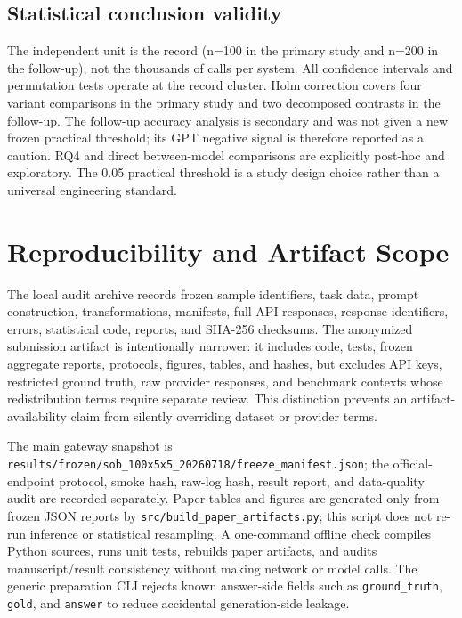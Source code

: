 \documentclass[10pt]{article}
\begin{document}
\subsection{Statistical conclusion validity}
The independent unit is the record (n=100 in the primary study and n=200 in the follow-up), not the thousands of calls per system. All confidence intervals and permutation tests operate at the record cluster. Holm correction covers four variant comparisons in the primary study and two decomposed contrasts in the follow-up. The follow-up accuracy analysis is secondary and was not given a new frozen practical threshold; its GPT negative signal is therefore reported as a caution. RQ4 and direct between-model comparisons are explicitly post-hoc and exploratory. The 0.05 practical threshold is a study design choice rather than a universal engineering standard.

\section{Reproducibility and Artifact Scope}
The local audit archive records frozen sample identifiers, task data, prompt construction, transformations, manifests, full API responses, response identifiers, errors, statistical code, reports, and SHA-256 checksums. The anonymized submission artifact is intentionally narrower: it includes code, tests, frozen aggregate reports, protocols, figures, tables, and hashes, but excludes API keys, restricted ground truth, raw provider responses, and benchmark contexts whose redistribution terms require separate review. This distinction prevents an artifact-availability claim from silently overriding dataset or provider terms.

The main gateway snapshot is \texttt{results/\allowbreak{}frozen/s\allowbreak{}ob\_100x5\allowbreak{}x5\_20260\allowbreak{}718/free\allowbreak{}ze\_manif\allowbreak{}est.json}; the official-endpoint protocol, smoke hash, raw-log hash, result report, and data-quality audit are recorded separately. Paper tables and figures are generated only from frozen JSON reports by \texttt{src/build\_paper\_artifacts.py}; this script does not re-run inference or statistical resampling. A one-command offline check compiles Python sources, runs unit tests, rebuilds paper artifacts, and audits manuscript/result consistency without making network or model calls. The generic preparation CLI rejects known answer-side fields such as \texttt{ground\_truth}, \texttt{gold}, and \texttt{answer} to reduce accidental generation-side leakage.
\end{document}
